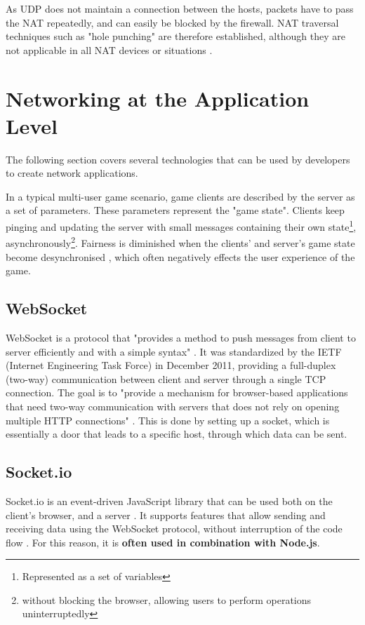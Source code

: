 \documentclass[bsc, 12pt, twoside, singlespacing, parskip, abbrevs, notimes, normalheadings, logo]{styles/infthesis}
\begin{document}
As UDP does not maintain a connection between the hosts, packets have to pass the NAT repeatedly, and can easily be blocked by the firewall. 
NAT traversal techniques such as "hole punching" are therefore established, although they are not applicable in all NAT devices or situations \cite{udp_holepunching}.

\section{Networking at the Application Level}
The following section covers several technologies that can be used by developers to create network applications.

In a typical multi-user game scenario, game clients are described by the server as a set of parameters. These parameters represent the "game state". Clients keep pinging and updating the server with small messages containing their own state\footnote{Represented as a set of variables}, asynchronously\footnote{without blocking the browser, allowing users to perform operations uninterruptedly}. Fairness is diminished when the clients' and server's game state become desynchronised \cite{Fairness_and_Playability}, which often negatively effects the user experience of the game.

\subsection{WebSocket}
WebSocket is a protocol that "provides a method to push messages from client to server efficiently and with a simple syntax" \cite{WebSocket}. It was standardized by the IETF (Internet Engineering Task Force) in December 2011, providing a full-duplex (two-way) communication between client and server through a single TCP connection. The goal is to "provide a mechanism for browser-based applications that need two-way communication with servers that does not rely on opening multiple HTTP connections" \cite{websocket_communication}. This is done by setting up a socket, which is essentially a door that leads to a specific host, through which data can be sent.

\subsection{Socket.io}
Socket.io is an event-driven JavaScript library that can be used both on the client's browser, and a server \cite{Socketio}. It supports features that allow sending and receiving data using the WebSocket protocol, without interruption of the code flow \cite{Socketio_Benchmark, Socketio_TCP_Benchmark}. For this reason, it is \textbf{often used in combination with Node.js}.
\end{document}
